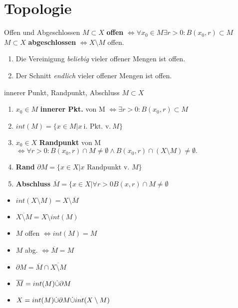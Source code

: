 \section{Topologie}

\begin{definition}{Offen und Abgeschlossen}
  $M \subset X$ \textbf{offen} $\Leftrightarrow \forall x_0 \in M
  \exists r>0: B(x_0,r) \subset M$\\
  $M \subset X$ \textbf{abgeschlossen} $\Leftrightarrow X\setminus M$ offen.
\end{definition}

\begin{lemma}
  \begin{enumerate}[label = (\arabic*)]
    \item Die Vereinigung \textit{beliebig} vieler offener Mengen ist offen.
    \item Der Schnitt \textit{endlich} vieler offener Mengen ist offen.
  \end{enumerate}
\end{lemma}

\begin{definition}{innerer Punkt, Randpunkt, Abschluss}
  $M \subset X$
  \begin{enumerate}[label = (\arabic*)]
    \item $x_0 \in M$ \textbf{innerer Pkt.} von M
      $\Leftrightarrow \exists r>0: B(x_0,r) \subset M$
    \item $int(M) = \{x \in M|x\ \text{i. Pkt. v.}\ M\}$
    \item $x_0 \in X$ \textbf{Randpunkt} von M $\Leftrightarrow
      \forall r>0: B(x_0,r) \cap M \neq \emptyset \wedge B(x_0,r)
      \cap (X\setminus M) \neq \emptyset.$
    \item \textbf{Rand} $\partial M = \{x\in X| x \text{ Randpunkt v. } M\}$
    \item \textbf{Abschluss} $\overline{M} = \{x \in X|\forall r>0 B(x,r)\cap
      M \neq \emptyset$
  \end{enumerate}
\end{definition}

\begin{itemize}
  \item $int(X\setminus M) = X \setminus \overline{M}$
  \item $\overline{X \setminus M} = X \setminus int(M)$
  \item $M$ offen $\Leftrightarrow int(M) = M$
  \item $M$ abg. $\Leftrightarrow \overline{M} = M$
  \item $\partial M = \overline{M} \cap \overline{X\setminus M}$
  \item $\overline{M} = int(M) \dot{\cup} \partial M$
  \item $X = int(M) \dot{\cup} \partial M \dot{\cup} int(X \setminus M)$
\end{itemize}
\heel

